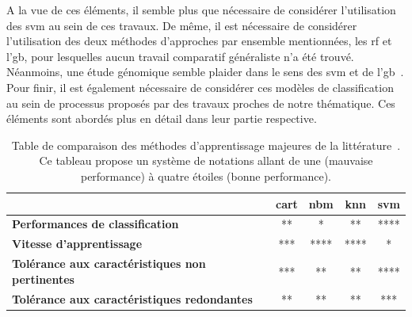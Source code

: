 A la vue de ces éléments, il semble plus que nécessaire de considérer l'utilisation des \gls{svm} au sein de ces travaux. De même, il est nécessaire de considérer l'utilisation des deux méthodes d'approches par ensemble mentionnées, les \gls{rf} et l'\gls{gb}, pour lesquelles aucun travail comparatif généraliste n'a été trouvé. Néanmoins, une étude génomique semble plaider dans le sens des \gls{svm} et de l'\gls{gb}~\cite{Ogutu2011}. Pour finir, il est également nécessaire de considérer ces modèles de classification au sein de processus proposés par des travaux proches de notre thématique. Ces éléments sont abordés plus en détail dans leur partie respective.\par

\begin{table}[H]
  \small
  \centering 
    \begin{tabular}{lcccc}
        \toprule
                                                                    & \textbf{\gls{cart}}   & \textbf{\gls{nbm}}& \textbf{\gls{knn}}    & \textbf{\gls{svm}}\\
        \midrule
        \textbf{Performances de classification}                     & **                    & *                 & **                    & ****              \\
        \midrule
        \textbf{Vitesse d'apprentissage}                            & ***                   & ****              & ****                  & *                 \\
        \midrule
        \textbf{Tolérance aux caractéristiques non pertinentes}     & ***                   & **                & **                    & ****              \\
        \midrule
        \textbf{Tolérance aux caractéristiques redondantes}         & **                    & **                & **                    & ***               \\
        \bottomrule
  \end{tabular}
  \caption{Table de comparaison des méthodes d'apprentissage majeures de la littérature~\cite{Kotsiantis2007}. Ce tableau propose un système de notations allant de une (mauvaise performance) à quatre étoiles (bonne performance).}
  \label{tab:model_comparison}
\end{table}
\clearpage

